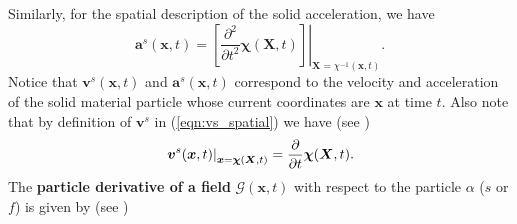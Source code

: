 Similarly, for the spatial description of the solid acceleration, we have
\begin{equation}
 \boldsymbol{a}^{s}(\boldsymbol{x},t)= \left. \left[ \frac{\partial^{2}}{\partial t^{2}}\boldsymbol\chi(\boldsymbol{X},t) \right] \right|_{\boldsymbol{X}={\chi}^{-1}(\boldsymbol{x},t)}.
\end{equation}
Notice that $\boldsymbol{v}^{s}(\boldsymbol{x},t)$ and $\boldsymbol{a}^{s}(\boldsymbol{x},t)$ correspond to the velocity and acceleration of the solid material particle whose current coordinates are $\boldsymbol{x}$ at time $t$. Also note that by definition of $\boldsymbol{v}^{s}$ in (\ref{eqn:vs_spatial}) we have (see \citep[page 132]{gonzalez2008first})
\begin{equation}
 \left. \boldsymbol{v}^{s}(\boldsymbol{x},t)
\right|_{\boldsymbol{x}=\boldsymbol{\chi}(\boldsymbol{X},t)} =  \frac{\partial }{\partial t}\boldsymbol{\chi}(\boldsymbol{X},t) .
\label{eqn:spatial_velocity}
\end{equation}
The \textbf{particle derivative of a field} $\mathcal{G}(\boldsymbol{x},t)$ with respect to the particle $\alpha$ ($s$ or $f$) is given by (see \citep[eqn. (1.43)]{coussy2004poromechanics})
